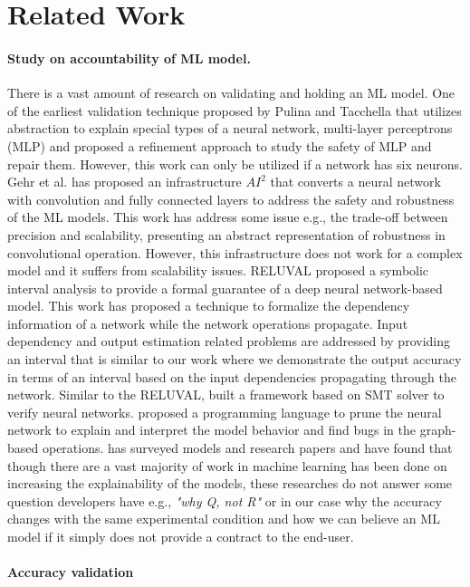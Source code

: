 \section{Related Work}
\label{sec:relatedwork}
\paragraph{\textbf{Study on accountability of ML model.}}
There is a vast amount of research on validating and holding an ML model. One of the earliest validation technique proposed by Pulina and Tacchella \cite{pulina2010abstraction} that utilizes abstraction to explain special types of a neural network, multi-layer perceptrons (MLP) and proposed a refinement approach to study the safety of MLP and repair them. However, this work can only be utilized if a network has six neurons. Gehr et al. \cite{gehr2018ai2} has proposed an infrastructure $AI^{2}$ that converts a neural network with convolution and fully connected layers to address the safety and robustness of the ML models. This work has address some issue e.g., the trade-off between precision and scalability, presenting an abstract representation of robustness in convolutional operation. However, this infrastructure does not work for a complex model and it suffers from scalability issues. RELUVAL \cite{wang2018formal} proposed a symbolic interval analysis to provide a formal guarantee of a deep neural network-based model. This work has proposed a technique to formalize the dependency information of a network while the network operations propagate. Input dependency and output estimation related problems are addressed by providing an interval that is similar to our work where we demonstrate the output accuracy in terms of an interval based on the input dependencies propagating through the network. Similar to the RELUVAL, \cite{katz2017reluplex} built a framework based on SMT solver to verify neural networks. \cite{jia2019taso} proposed a programming language to prune the neural network to explain and interpret the model behavior and find bugs in the graph-based operations. \cite{du2018techniques} has surveyed models and research papers and have found that though there are a vast majority of work in machine learning has been done on increasing the explainability of the models, these researches do not answer some question developers have e.g., \emph{"why Q, not R"} or in our case why the accuracy changes with the same experimental condition and how we can believe an ML model if it simply does not provide a contract to the end-user.
\paragraph{\textbf{Accuracy validation}}
